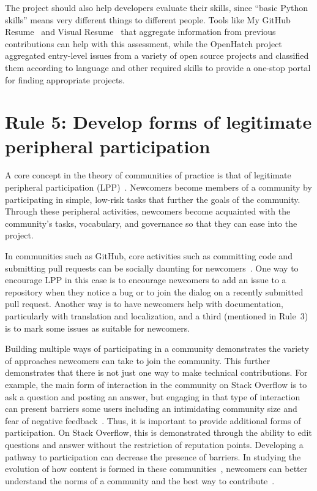 \documentclass[10pt,letterpaper]{article}
\newcommand{\rulemajor}[1]{\section*{#1}}
\begin{document}
The project should also help developers evaluate their skills,
since ``basic Python skills'' means very different things to different people.
Tools like My GitHub Resume~\cite{my-github-resume} and Visual Resume~\cite{sarma2016}
that aggregate information from previous contributions can help with this assessment,
while the OpenHatch project~\cite{openhatch} aggregated entry-level issues from a variety of open source projects
and classified them according to language and other required skills
to provide a one-stop portal for finding appropriate projects.

\rulemajor{Rule 5: Develop forms of legitimate peripheral participation}

A core concept in the theory of communities of practice is that of
legitimate peripheral participation (LPP)~\cite{lave1991,wenger1999}.
Newcomers become members of a community by participating in simple, low-risk tasks
that further the goals of the community.
Through these peripheral activities,
newcomers become acquainted with the community's tasks, vocabulary, and governance
so that they can ease into the project.

In communities such as GitHub,
core activities such as committing code and submitting pull requests can be socially daunting for newcomers~\cite{steinmacher2015}.
One way to encourage LPP in this case is to encourage newcomers to add an issue to a repository when they notice a bug
or to join the dialog on a recently submitted pull request.
Another way is to have newcomers help with documentation,
particularly with translation and localization,
and a third (mentioned in Rule~3) is to mark some issues as suitable for newcomers.

Building multiple ways of participating in a community demonstrates the variety of approaches newcomers can take to join the community.
This further demonstrates that there is not just one way to make technical contributions.
For example,
the main form of interaction in the community on Stack Overflow is to ask a question and posting an answer,
but engaging in that type of interaction can present barriers some users
including an intimidating community size and fear of negative feedback~\cite{ford2016}.
Thus, it is important to provide additional forms of participation.
On Stack Overflow, this is demonstrated through the ability to edit questions and answer without the restriction of reputation points.
Developing a pathway to participation can decrease the presence of barriers.
In studying the evolution of how content is formed in these communities~\cite{baltes2018},
newcomers can better understand the norms of a community and the best way to contribute~\cite{ford2018}.
\end{document}
